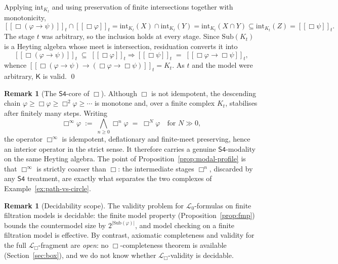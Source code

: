 \documentclass[final,12pt]{elsarticle}
\newcommand{\llbracket}{[\![}
\newcommand{\rrbracket}{]\!]}
\theoremstyle{plain}
\theoremstyle{definition}
\newtheorem{rem}[thm]{Remark}
\begin{document}
Applying \(\mathrm{int}_{K_t}\) and using preservation of finite
intersections together with monotonicity,
\[
  \llbracket\Box(\varphi\to\psi)\rrbracket_t \cap
  \llbracket\Box\varphi\rrbracket_t
  = \mathrm{int}_{K_t}(X) \cap \mathrm{int}_{K_t}(Y)
  = \mathrm{int}_{K_t}(X \cap Y)
  \subseteq \mathrm{int}_{K_t}(Z)
  = \llbracket\Box\psi\rrbracket_t .
\]
The stage \(t\) was arbitrary, so the inclusion holds at every stage.  Since
\(\mathrm{Sub}(K_t)\) is a Heyting algebra whose meet is intersection,
residuation converts it into
\[
  \llbracket\Box(\varphi\to\psi)\rrbracket_t
  \;\subseteq\;
  \llbracket\Box\varphi\rrbracket_t \Rightarrow \llbracket\Box\psi\rrbracket_t
  \;=\;
  \llbracket\Box\varphi\to\Box\psi\rrbracket_t ,
\]
whence
\(\llbracket\Box(\varphi\to\psi)\to(\Box\varphi\to\Box\psi)\rrbracket_t = K_t\).
As \(t\) and the model were arbitrary, \(\mathsf{K}\) is valid.
\qed
\begin{rem}[The \(\mathsf{S4}\)-core of \(\Box\)]\label{rem:box-core}
Although \(\Box\) is not idempotent, the descending chain
\(\varphi\ge\Box\varphi\ge\Box^{2}\varphi\ge\cdots\) is monotone and,
over a finite complex \(K_t\), stabilises after finitely many steps.
Writing
\[
  \Box^{\infty}\varphi \;:=\; \bigwedge_{n\ge 0}\Box^{n}\varphi
  \;=\; \Box^{N}\varphi \quad\text{for } N\gg 0,
\]
the operator \(\Box^{\infty}\) is idempotent, deflationary and
finite-meet preserving, hence an interior operator in the strict sense.
It therefore carries a genuine \(\mathsf{S4}\)-modality on the same
Heyting algebra. The point of Proposition~\ref{prop:modal-profile} is
that \(\Box^{\infty}\) is strictly coarser than \(\Box\): the
intermediate stages \(\Box^{n}\), discarded by any \(\mathsf{S4}\)
treatment, are exactly what separates the two complexes of
Example~\ref{ex:path-vs-circle}.
\end{rem}

\begin{rem}[Decidability scope]
The validity problem for \(\mathcal{L}_0\)-formulas on finite filtration models is
decidable: the finite model property (Proposition~\ref{prop:fmp}) bounds the
countermodel size by \(2^{|\mathrm{Sub}(\varphi)|}\), and model checking on a
finite filtration model is effective.  By contrast, axiomatic completeness and
validity for the full \(\mathcal{L}_\Box\)-fragment are \emph{open}: no
\(\Box\)-completeness theorem is available (Section~\ref{sec:box}), and we do
not know whether \(\mathcal{L}_\Box\)-validity is decidable.
\end{rem}
\end{document}
